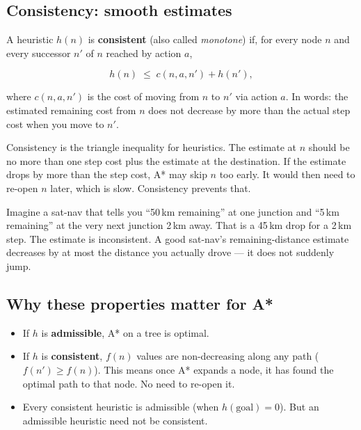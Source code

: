 \documentclass[a4paper,11pt]{article}
\newcommand{\vocab}[1]{\textbf{\color{navy}#1}}
\begin{document}
\subsection{Consistency: smooth estimates}

A heuristic $h(n)$ is \vocab{consistent} (also called \emph{monotone}) if,
for every node $n$ and every successor $n'$ of $n$ reached by action $a$,

\[
  h(n) \;\le\; c(n, a, n') + h(n'),
\]

where $c(n, a, n')$ is the cost of moving from $n$ to $n'$ via action $a$.
In words: the estimated remaining cost from $n$ does not decrease by more
than the actual step cost when you move to $n'$.

\begin{intuition}
Consistency is the triangle inequality for heuristics. The estimate at $n$
should be no more than one step cost plus the estimate at the destination.
If the estimate drops by more than the step cost, A* may skip $n$ too
early. It would then need to re-open $n$ later, which is slow. Consistency
prevents that.
\end{intuition}

\begin{everyday}
Imagine a sat-nav that tells you ``50\,km remaining'' at one junction and
``5\,km remaining'' at the very next junction 2\,km away. That is a 45\,km
drop for a 2\,km step. The estimate is inconsistent. A good sat-nav's
remaining-distance estimate decreases by at most the distance you actually
drove --- it does not suddenly jump.
\end{everyday}

\subsection*{Why these properties matter for A*}

\begin{itemize}
  \item If $h$ is \textbf{admissible}, A* on a tree is optimal.
  \item If $h$ is \textbf{consistent}, $f(n)$ values are non-decreasing
    along any path ($f(n') \ge f(n)$). This means once A* expands a node,
    it has found the optimal path to that node. No need to re-open it.
  \item Every consistent heuristic is admissible (when $h(\text{goal})=0$).
    But an admissible heuristic need not be consistent.
\end{itemize}
\end{document}
